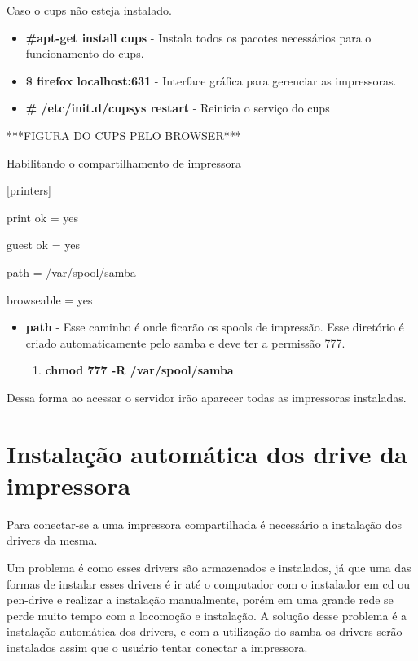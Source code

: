Caso o cups não esteja instalado.

\begin{itemize}
	\item \textbf{\#apt-get install cups} - Instala todos os pacotes necessários para o funcionamento do cups.
	\item \textbf{\$ firefox localhost:631} - Interface gráfica para gerenciar as impressoras.
	\item \textbf{\# /etc/init.d/cupsys restart} - Reinicia o serviço do cups
\end{itemize}

***FIGURA DO CUPS PELO BROWSER***

Habilitando o compartilhamento de impressora

[printers]

print ok = yes

guest ok = yes

path = /var/spool/samba

browseable = yes

\begin{itemize}
	\item \textbf{path} - Esse caminho é onde ficarão os spools de impressão. Esse diretório é criado automaticamente pelo samba e deve ter a permissão 777.
	\begin{enumerate}
		\item \textbf{chmod 777 -R /var/spool/samba}
	\end{enumerate}
\end{itemize}

Dessa forma ao acessar o servidor irão aparecer todas as impressoras instaladas.

\section{Instalação automática dos drive da impressora}

Para conectar-se a uma impressora compartilhada é necessário a instalação dos drivers da mesma. 

Um problema é como esses drivers são armazenados e instalados, já que uma das formas de instalar esses drivers é ir até o computador com o instalador em cd ou pen-drive e realizar a instalação manualmente, porém em uma grande rede se perde muito tempo com a locomoção e instalação. A solução desse problema é a instalação automática dos drivers, e com a utilização do samba os drivers serão instalados assim que o usuário tentar conectar a impressora.

